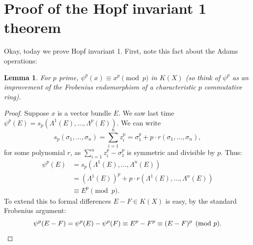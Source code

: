 \documentclass{article}
\providecommand{\OutputProofOfHopfInvariantOne}{13}
\newtheorem{lem}[thm]{Lemma}
\begin{document}
\section{Proof of the Hopf invariant 1 theorem} %
\label{ProofOfHopfInvariantOne}
\ifx\OutputProofOfHopfInvariantOne\undefined\else
Okay, today we prove Hopf invariant 1.  First, note this fact about the Adams operations:
\begin{lem}\label{frobeniuslemma}
For $p$ prime, $\psi^p(x) \equiv x^p \pmod{p}$ in $K(X)$ (so think of $\psi^p$ as an improvement of the Frobenius endomorphism of a characteristic $p$ commutative ring).
\end{lem}
\begin{proof}
Suppose $x$ is a vector bundle $E$.  We saw last time $\psi^p(E) = s_p(\Lambda^1 (E), \ldots, \Lambda^p (E))$. We can write 
\[s_p(\sigma_1, \ldots, \sigma_n) = \sum_{i=1}^n z_i^p = \sigma_1^p + p \cdot r(\sigma_1, \ldots, \sigma_n),\]
for some polynomial $r$, as $\sum_{i=1}^n z_i^p - \sigma_1^p$ is symmetric and divisible by $p$.  Thus:
\begin{align*}
\psi^p(E) & = s_p(\Lambda^1 (E), \ldots, \Lambda^n (E)) \\
& = (\Lambda^1 (E))^p + p \cdot r(\Lambda^1 (E), \ldots, \Lambda^n (E)) \\
& \equiv E^p \pmod p.
\end{align*}
To extend this to formal differences $E-F\in K(X)$ is easy, by the standard Frobenius argument:
\[\psi^p(E - F)  = \psi^p(E) - \psi^p(F)
\equiv E^p-F^p\equiv(E-F)^p \pmod{p}.\qedhere\]
\end{proof}
\end{document}
